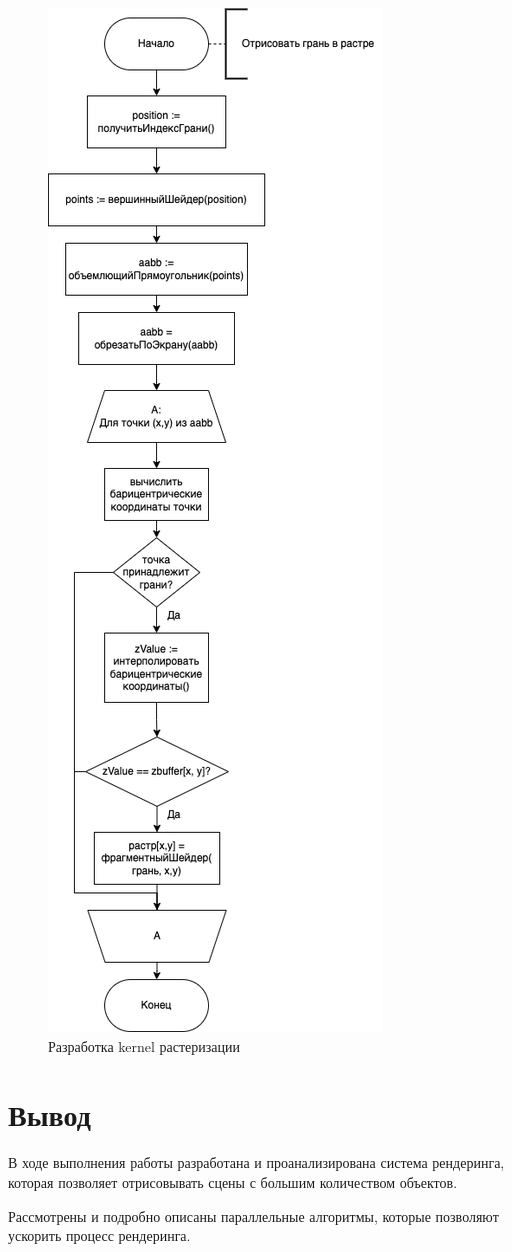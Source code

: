 \begin{figure}[ph!]
	\centering
	\includegraphics[height=0.95\textheight]{inc/img/diagrams-rasterizer.drawio.png}
	\caption{Разработка kernel растеризации}
	\label{fig:diagram_count}
\end{figure}

\pagebreak

\section*{Вывод}

В ходе выполнения работы разработана и проанализирована система рендеринга, которая позволяет отрисовывать сцены с большим количеством объектов.

Рассмотрены и подробно описаны параллельные алгоритмы, которые позволяют ускорить процесс рендеринга.

